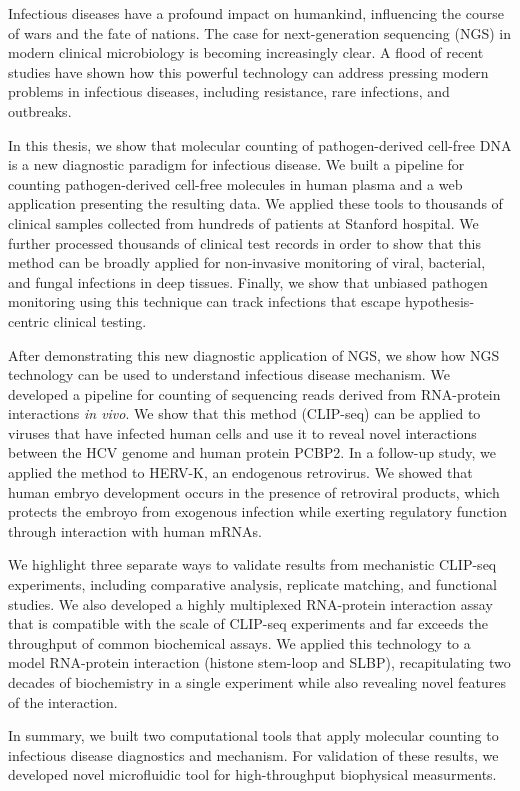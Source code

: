 

Infectious diseases have a profound impact on humankind, influencing the course of wars and the fate of nations. The case for next-generation sequencing (NGS) in modern clinical microbiology is becoming increasingly clear. A flood of recent studies have shown how this powerful technology can address pressing modern problems in infectious diseases, including resistance, rare infections, and outbreaks.

In this thesis, we show that molecular counting of pathogen-derived cell-free DNA is a new diagnostic paradigm for infectious disease. We built a pipeline for counting pathogen-derived cell-free molecules in human plasma and a web application presenting the resulting data. We applied these tools to thousands of clinical samples collected from hundreds of patients at Stanford hospital. We further processed thousands of clinical test records in order to show that this method can be broadly applied for non-invasive monitoring of viral, bacterial, and fungal infections in deep tissues. Finally, we show that unbiased pathogen monitoring using this technique can track infections that escape hypothesis-centric clinical testing.

After demonstrating this new diagnostic application of NGS, we show how NGS technology can be used to understand infectious disease mechanism. We developed a pipeline for counting of sequencing reads derived from RNA-protein interactions \emph{in vivo}. We show that this method (CLIP-seq) can be applied to viruses that have infected human cells and use it to reveal novel interactions between the HCV genome and human protein PCBP2. In a follow-up study, we applied the method to HERV-K, an endogenous retrovirus. We showed that human embryo development occurs in the presence of retroviral products, which protects the embroyo from exogenous infection while exerting regulatory function through interaction with human mRNAs. 

We highlight three separate ways to validate results from mechanistic CLIP-seq experiments, including comparative analysis, replicate matching, and functional studies. We also developed a highly multiplexed RNA-protein interaction assay that is compatible with the scale of CLIP-seq experiments and far exceeds the throughput of common biochemical assays. We applied this technology to a model RNA-protein interaction (histone stem-loop and SLBP), recapitulating two decades of biochemistry in a single experiment while also revealing novel features of the interaction.  

In summary, we built two computational tools that apply molecular counting to infectious disease diagnostics and mechanism. For validation of these results, we developed novel microfluidic tool for high-throughput biophysical measurments.